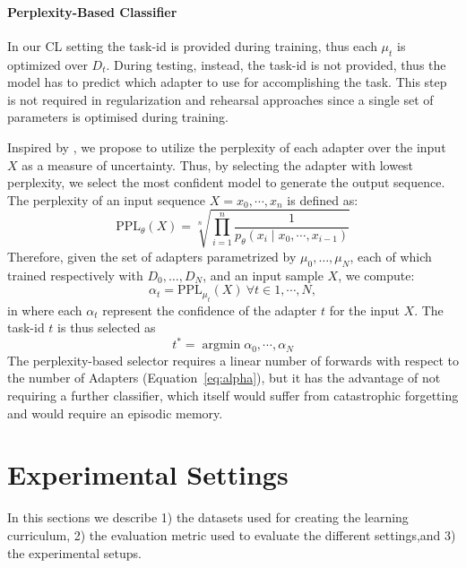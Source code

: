 \documentclass[11pt,a4paper]{article}
\begin{document}
\paragraph{Perplexity-Based Classifier} In our CL setting the task-id is provided during training, thus each $\mu_t$ is optimized over $D_t$. During testing, instead, the task-id is not provided, thus the model has to predict which adapter to use for accomplishing the task. This step is not required in regularization and rehearsal approaches since a single set of parameters is optimised during training.

Inspired by \citet{wortsman2020supermasks}, we propose to utilize the perplexity of each adapter over the input $X$ as a measure of uncertainty. Thus, by selecting the adapter with lowest perplexity, we select the most confident model to generate the output sequence. The perplexity of an input sequence $X=x_{0}, \cdots, x_{n}$ is defined as:
\begin{equation}
    \mathrm{PPL}_{\theta}(X)=\sqrt[n]{\prod_{i=1}^{n} \frac{1}{p_{\theta}\left(x_{i} \mid x_{0}, \cdots, x_{i-1}\right)}}
\end{equation}
Therefore, given the set of adapters parametrized by $\mu_0,\dots, \mu_N$, each of which trained respectively with $D_0, \dots, D_N$, and an input sample $X$, we compute:
\begin{equation}
   \alpha_t = \mathrm{PPL}_{\mu_t}(X) \ \forall t \in 1, \cdots, N,\label{eq:alpha}
\end{equation}
in where each $\alpha_t$ represent the confidence of the adapter $t$ for the input $X$. The task-id $t$ is thus selected as 
\begin{equation}
    t^* = \operatorname*{argmin}{\alpha_0,\cdots,\alpha_N}\label{eq:selection}
\end{equation}
The perplexity-based selector requires a linear number of forwards with respect to the number of Adapters (Equation~\ref{eq:alpha}), but it has the advantage of not requiring a further classifier, which itself would suffer from catastrophic forgetting and would require an episodic memory. 

\section{Experimental Settings} \label{sec:experiment}
In this sections we describe 1) the datasets used for creating the learning curriculum, 2) the evaluation metric used to evaluate the different settings,and 3) the experimental setups.
\end{document}
